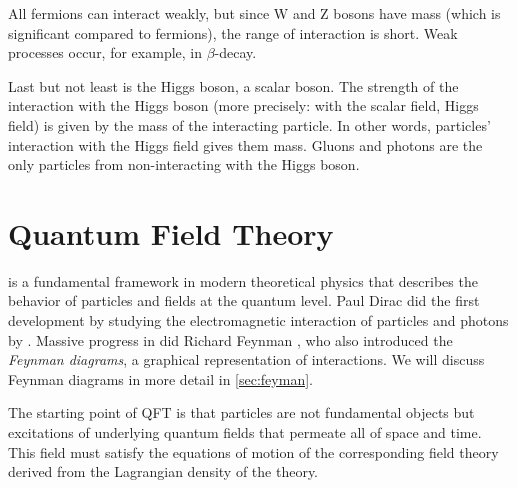 All fermions can interact weakly, but since W and Z bosons have mass (which is significant compared to fermions), the range of interaction is short.
Weak processes occur, for example, in $\beta$-decay.

Last but not least is the Higgs boson, a scalar boson.
The strength of the interaction with the Higgs boson (more precisely: with the scalar field, Higgs field) is given by the mass of the interacting particle.
In other words, particles' interaction with the Higgs field gives them mass.
Gluons and photons are the only particles from \SM non-interacting with the Higgs boson.



\section{Quantum Field Theory}
\label{sec:qft}
\QFT is a fundamental framework in modern theoretical physics that describes the behavior of particles and fields at the quantum level.
Paul Dirac did the first development by studying the electromagnetic interaction of particles and photons by \cite{dirac}.
Massive progress in \QED did Richard Feynman \cite{feynman}, who also introduced the \emph{Feynman diagrams}, a graphical representation of interactions.
We will discuss Feynman diagrams in more detail in \cref{sec:feyman}.

The starting point of QFT is that particles are not fundamental objects but excitations of underlying quantum fields that permeate all of space and time. 
This field must satisfy the equations of motion of the corresponding field theory derived from the Lagrangian density of the theory.

